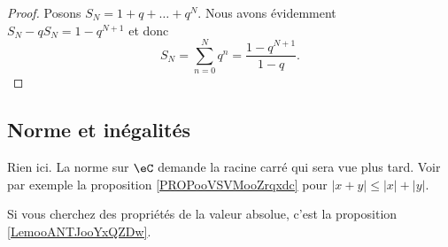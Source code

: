 \begin{proof}
	Posons \( S_N=1+q+\ldots+q^N\). Nous avons évidemment \( S_N-qS_N=1-q^{N+1}\) et donc
	\begin{equation}    \label{EqASYTiCK}
		S_N=\sum_{n=0}^Nq^n=\frac{ 1-q^{N+1} }{ 1-q }.
	\end{equation}
\end{proof}


\subsection{Norme et inégalités}

Rien ici. La norme sur \( \eC\) demande la racine carré qui sera vue plus tard. Voir par exemple la proposition \ref{PROPooVSVMooZrqxdc} pour \( | x+y |\leq |x|+| y |\).

Si vous cherchez des propriétés de la valeur absolue, c'est la proposition \ref{LemooANTJooYxQZDw}.
